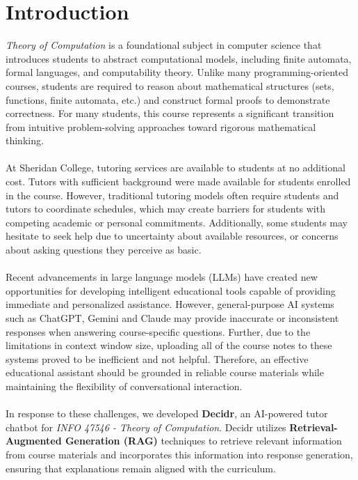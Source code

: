 \documentclass[12pt, a4paper]{report}
\begin{document}
\chapter{Introduction}
\textit{Theory of Computation} is a foundational subject in computer science that introduces students to abstract computational models, including finite automata, formal languages, and computability theory. Unlike many programming-oriented courses, students are required to reason about mathematical structures (sets, functions, finite automata, etc.) and construct formal proofs to demonstrate correctness. For many students, this course represents a significant transition from intuitive problem-solving approaches toward rigorous mathematical thinking.~\\~\\
At Sheridan College, tutoring services are available to students at no additional cost. Tutors with sufficient background were made available for students enrolled in the course. However, traditional tutoring models often require students and tutors to coordinate schedules, which may create barriers for students with competing academic or personal commitments. Additionally, some students may hesitate to seek help due to uncertainty about available resources, or concerns about asking questions they perceive as basic.~\\~\\
Recent advancements in large language models (LLMs) have created new opportunities for developing intelligent educational tools capable of providing immediate and personalized assistance. However, general-purpose AI systems such as ChatGPT, Gemini and Claude may provide inaccurate or inconsistent responses when answering course-specific questions. Further, due to the limitations in context window size, uploading all of the course notes to these systems proved to be inefficient and not helpful. Therefore, an effective educational assistant should be grounded in reliable course materials while maintaining the flexibility of conversational interaction.~\\~\\
In response to these challenges, we developed \textbf{Decidr}, an AI-powered tutor chatbot for \textit{INFO 47546 - Theory of Computation}. Decidr utilizes \textbf{Retrieval-Augmented Generation (RAG)} techniques to retrieve relevant information from course materials and incorporates this information into response generation, ensuring that explanations remain aligned with the curriculum.
\end{document}
